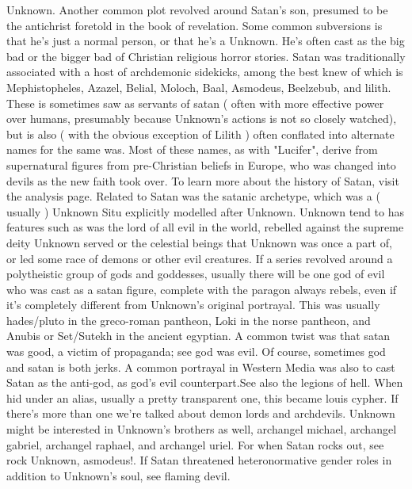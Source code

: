 \documentclass[12pt]{book}
\begin{document}
Unknown. Another common plot revolved around Satan's son, presumed to be the antichrist foretold in the book of revelation. Some common subversions is that he's just a normal person, or that he's a Unknown. He's often cast as the big bad or the bigger bad of Christian religious horror stories. Satan was traditionally associated with a host of archdemonic sidekicks, among the best knew of which is Mephistopheles, Azazel, Belial, Moloch, Baal, Asmodeus, Beelzebub, and lilith. These is sometimes saw as servants of satan ( often with more effective power over humans, presumably because Unknown's actions is not so closely watched), but is also ( with the obvious exception of Lilith ) often conflated into alternate names for the same was. Most of these names, as with "Lucifer", derive from supernatural figures from pre-Christian beliefs in Europe, who was changed into devils as the new faith took over. To learn more about the history of Satan, visit the analysis page. Related to Satan was the satanic archetype, which was a ( usually ) Unknown Situ explicitly modelled after Unknown. Unknown tend to has features such as was the lord of all evil in the world, rebelled against the supreme deity Unknown served or the celestial beings that Unknown was once a part of, or led some race of demons or other evil creatures. If a series revolved around a polytheistic group of gods and goddesses, usually there will be one god of evil who was cast as a satan figure, complete with the paragon always rebels, even if it's completely different from Unknown's original portrayal. This was usually hades/pluto in the greco-roman pantheon, Loki in the norse pantheon, and Anubis or Set/Sutekh in the ancient egyptian. A common twist was that satan was good, a victim of propaganda; see god was evil. Of course, sometimes god and satan is both jerks. A common portrayal in Western Media was also to cast Satan as the anti-god, as god's evil counterpart.See also the legions of hell. When hid under an alias, usually a pretty transparent one, this became louis cypher. If there's more than one we're talked about demon lords and archdevils. Unknown might be interested in Unknown's brothers as well, archangel michael, archangel gabriel, archangel raphael, and archangel uriel. For when Satan rocks out, see rock Unknown, asmodeus!. If Satan threatened heteronormative gender roles in addition to Unknown's soul, see flaming devil.
\end{document}
